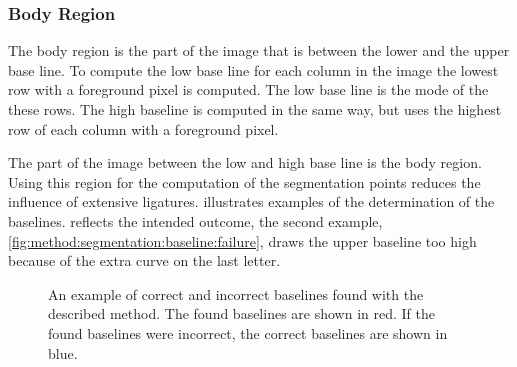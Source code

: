 \subsubsection{Body Region}
\label{sss:method:segmentaton:bodyregion}
	The body region is the part of the image that is between the lower and the upper base line. To compute the low base line for each column in the image the lowest row with a foreground pixel is computed. The low base line is the mode of the these rows. The high baseline is computed in the same way, but uses the highest row of each column with a foreground pixel. 

	The part of the image between the low and high base line is the body region. Using this region for the computation of the segmentation points reduces the influence of extensive ligatures.  illustrates examples of the determination of the baselines.  reflects the intended outcome, the second example, \cref{fig:method:segmentation:baseline:failure}, draws the upper baseline too high because of the extra curve on the last letter.

	\begin{figure}
		\centering
		\hspace{0.05\columnwidth}
		\caption{An example of \protect{} correct and \protect{} incorrect baselines found with the described method. The found baselines are shown in red. If the found baselines were incorrect, the correct baselines are shown in blue.}
		\label{fig:method:segmentation:baseline}
	\end{figure}

